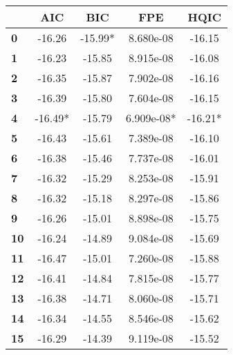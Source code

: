 \begin{center}
\begin{tabular}{lcccc}
\toprule
            & \textbf{AIC} & \textbf{BIC} & \textbf{FPE} & \textbf{HQIC}  \\
\midrule
\textbf{0}  &      -16.26  &     -15.99*  &   8.680e-08  &       -16.15   \\
\textbf{1}  &      -16.23  &      -15.85  &   8.915e-08  &       -16.08   \\
\textbf{2}  &      -16.35  &      -15.87  &   7.902e-08  &       -16.16   \\
\textbf{3}  &      -16.39  &      -15.80  &   7.604e-08  &       -16.15   \\
\textbf{4}  &     -16.49*  &      -15.79  &  6.909e-08*  &      -16.21*   \\
\textbf{5}  &      -16.43  &      -15.61  &   7.389e-08  &       -16.10   \\
\textbf{6}  &      -16.38  &      -15.46  &   7.737e-08  &       -16.01   \\
\textbf{7}  &      -16.32  &      -15.29  &   8.253e-08  &       -15.91   \\
\textbf{8}  &      -16.32  &      -15.18  &   8.297e-08  &       -15.86   \\
\textbf{9}  &      -16.26  &      -15.01  &   8.898e-08  &       -15.75   \\
\textbf{10} &      -16.24  &      -14.89  &   9.084e-08  &       -15.69   \\
\textbf{11} &      -16.47  &      -15.01  &   7.260e-08  &       -15.88   \\
\textbf{12} &      -16.41  &      -14.84  &   7.815e-08  &       -15.77   \\
\textbf{13} &      -16.38  &      -14.71  &   8.060e-08  &       -15.71   \\
\textbf{14} &      -16.34  &      -14.55  &   8.546e-08  &       -15.62   \\
\textbf{15} &      -16.29  &      -14.39  &   9.119e-08  &       -15.52   \\
\bottomrule
\end{tabular}
\end{center}
